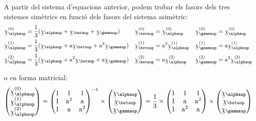 A partir del sistema d'equacions anterior, podem trobar els fasors
dels tres sistemes sim\`{e}trics en funci\'{o} dels fasors del sistema
asim\`{e}tric:
\begin{subequations}
\begin{align}
   \cmplx{\chi}_\alphaup\ap{(0)} &= \frac{1}{3} (\cmplx{\chi}_\alphaup + \cmplx{\chi}_\betaup +
   \cmplx{\chi}_\gammaup) & \cmplx{\chi}_\betaup\ap{(0)} &= \cmplx{\chi}_\alphaup\ap{(0)} &
   \cmplx{\chi}_\gammaup\ap{(0)} &= \cmplx{\chi}_\alphaup\ap{(0)}
   \label{eq:c_sim_c2}\\
   \cmplx{\chi}_\alphaup\ap{(1)} &= \frac{1}{3} (\cmplx{\chi}_\alphaup + \au \cmplx{\chi}_\betaup +
   \au^2 \cmplx{\chi}_\gammaup) & \cmplx{\chi}_\betaup\ap{(1)} &= \au^2 \cmplx{\chi}_\alphaup\ap{(1)} &
   \cmplx{\chi}_\gammaup\ap{(1)} &= \au \cmplx{\chi}_\alphaup\ap{(1)} \label{eq:c_sim_a2} \\
   \cmplx{\chi}_\alphaup\ap{(2)} &= \frac{1}{3} (\cmplx{\chi}_\alphaup + \au^2 \cmplx{\chi}_\betaup +
   \au \cmplx{\chi}_\gammaup) & \cmplx{\chi}_\betaup\ap{(2)} &= \au \cmplx{\chi}_\alphaup\ap{(2)} &
   \cmplx{\chi}_\gammaup\ap{(2)} &= \au^2 \cmplx{\chi}_\alphaup\ap{(2)} \label{eq:c_sim_b2}
\end{align}
\end{subequations}

o en forma matricial:
\begin{equation}
   \begin{pmatrix}
     \cmplx{\chi}_\alphaup\ap{(0)} \\
     \cmplx{\chi}_\alphaup\ap{(1)} \\
     \cmplx{\chi}_\alphaup\ap{(2)}
   \end{pmatrix} =
   \begin{pmatrix}
     1 & 1 & 1 \\
     1 & \au^2 & \au\\
     1 & \au & \au^2
   \end{pmatrix}^{-1} \times
   \begin{pmatrix}
     \cmplx{\chi}_\alphaup \\
     \cmplx{\chi}_\betaup \\
     \cmplx{\chi}_\gammaup
   \end{pmatrix} =  \frac{1}{3} \times
   \begin{pmatrix}
     1 & 1 & 1 \\
     1 & \au & \au^2 \\
     1 & \au^2 & \au
   \end{pmatrix} \times
   \begin{pmatrix}
     \cmplx{\chi}_\alphaup \\
     \cmplx{\chi}_\betaup \\
     \cmplx{\chi}_\gammaup
   \end{pmatrix}
\end{equation}

